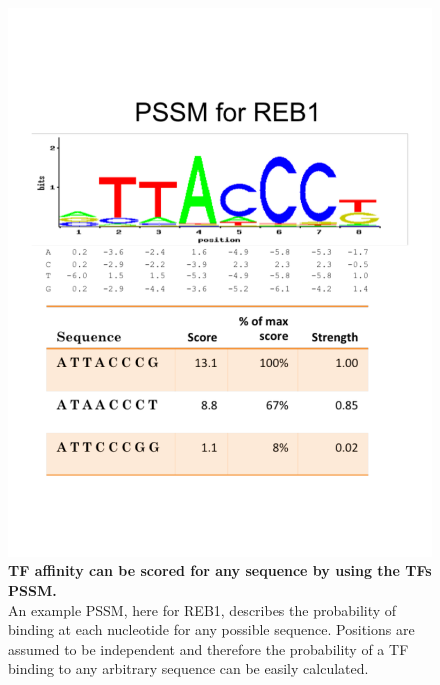 \documentclass{article}
\newcommand{\tab}{\hspace{9mm}}
\begin{document}
\begin{figure}[H]
  \centering
  \includegraphics[scale=0.29]{pssm_reb1.pdf}
  \vspace{-11mm}
  \caption{\textbf{TF affinity can be scored for any sequence by using the TFs PSSM.}\\An example PSSM, here for REB1, describes the probability of binding at each nucleotide for any possible sequence. Positions are assumed to be independent and therefore the probability of a TF binding to any arbitrary sequence can be easily calculated.}
  \label{fig:example}
\end{figure}

\end{document}
